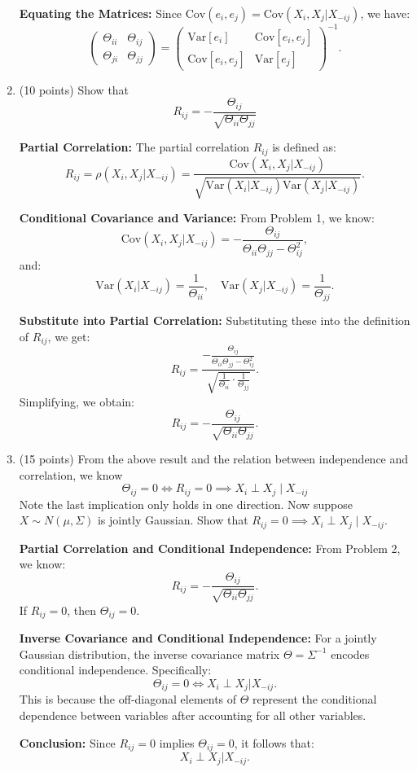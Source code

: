\documentclass[a3paper,12pt]{extarticle} %
\begin{document}
\begin{enumerate}
\textbf{Equating the Matrices:}
   Since \( \text{Cov}(e_i, e_j) = \text{Cov}(X_i, X_j | X_{-ij}) \), we have:
   \[
   \begin{pmatrix}
   \Theta_{ii} & \Theta_{ij} \\
   \Theta_{ji} & \Theta_{jj}
   \end{pmatrix}
   =
   \begin{pmatrix}
   \text{Var}[e_i] & \text{Cov}[e_i, e_j] \\
   \text{Cov}[e_i, e_j] & \text{Var}[e_j]
   \end{pmatrix}^{-1}.
   \]
    \item (10 points) Show that
    \[
    R_{ij} = -\frac{\Theta_{ij}}{\sqrt{\Theta_{ii} \Theta_{jj}}}
    \]
    
\textbf{Partial Correlation:}
The partial correlation \( R_{ij} \) is defined as:
\[
R_{ij} = \rho(X_i, X_j | X_{-ij}) = \frac{\text{Cov}(X_i, X_j | X_{-ij})}{\sqrt{\text{Var}(X_i | X_{-ij}) \text{Var}(X_j | X_{-ij})}}.
\]

\textbf{Conditional Covariance and Variance:}
From Problem 1, we know:
\[
\text{Cov}(X_i, X_j | X_{-ij}) = -\frac{\Theta_{ij}}{\Theta_{ii} \Theta_{jj} - \Theta_{ij}^2},
\]
and:
\[
\text{Var}(X_i | X_{-ij}) = \frac{1}{\Theta_{ii}}, \quad \text{Var}(X_j | X_{-ij}) = \frac{1}{\Theta_{jj}}.
\]

\textbf{Substitute into Partial Correlation:}
Substituting these into the definition of \( R_{ij} \), we get:
\[
R_{ij} = \frac{-\frac{\Theta_{ij}}{\Theta_{ii} \Theta_{jj} - \Theta_{ij}^2}}{\sqrt{\frac{1}{\Theta_{ii}} \cdot \frac{1}{\Theta_{jj}}}}.
\]
Simplifying, we obtain:
\[
R_{ij} = -\frac{\Theta_{ij}}{\sqrt{\Theta_{ii} \Theta_{jj}}}.
\]

    
    \item (15 points) From the above result and the relation between independence and correlation, we know
    \[
    \Theta_{ij} = 0 \iff R_{ij} = 0 \implies X_i \perp X_j \mid X_{-ij}
    \]
    Note the last implication only holds in one direction. Now suppose \(X \sim N(\mu, \Sigma)\) is jointly Gaussian. Show that \(R_{ij} = 0 \implies X_i \perp X_j \mid X_{-ij}\).

    \textbf{Partial Correlation and Conditional Independence:}
From Problem 2, we know:
\[
R_{ij} = -\frac{\Theta_{ij}}{\sqrt{\Theta_{ii} \Theta_{jj}}}.
\]
If \( R_{ij} = 0 \), then \( \Theta_{ij} = 0 \).

\textbf{Inverse Covariance and Conditional Independence:}
For a jointly Gaussian distribution, the inverse covariance matrix \( \Theta = \Sigma^{-1} \) encodes conditional independence. Specifically:
\[
\Theta_{ij} = 0 \iff X_i \perp X_j | X_{-ij}.
\]
This is because the off-diagonal elements of \( \Theta \) represent the conditional dependence between variables after accounting for all other variables.

\textbf{Conclusion:}
Since \( R_{ij} = 0 \) implies \( \Theta_{ij} = 0 \), it follows that:
\[
X_i \perp X_j | X_{-ij}.
\]

\end{enumerate}
\newpage
\end{document}
